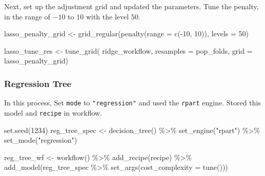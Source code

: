 \documentclass[
]{article}
\newenvironment{Shaded}{\begin{snugshade}}{\end{snugshade}}
\newcommand{\AttributeTok}[1]{\textcolor[rgb]{0.77,0.63,0.00}{#1}}
\newcommand{\DecValTok}[1]{\textcolor[rgb]{0.00,0.00,0.81}{#1}}
\newcommand{\FunctionTok}[1]{\textcolor[rgb]{0.00,0.00,0.00}{#1}}
\newcommand{\NormalTok}[1]{#1}
\newcommand{\OtherTok}[1]{\textcolor[rgb]{0.56,0.35,0.01}{#1}}
\newcommand{\SpecialCharTok}[1]{\textcolor[rgb]{0.00,0.00,0.00}{#1}}
\newcommand{\StringTok}[1]{\textcolor[rgb]{0.31,0.60,0.02}{#1}}
\begin{document}
Next, set up the adjustment grid and updated the parameters. Tune the
penalty, in the range of \(-10\) to \(10\) with the level \(50\).

\begin{Shaded}
\begin{Highlighting}[]
\NormalTok{lasso\_penalty\_grid }\OtherTok{\textless{}{-}} \FunctionTok{grid\_regular}\NormalTok{(}\FunctionTok{penalty}\NormalTok{(}\AttributeTok{range =} \FunctionTok{c}\NormalTok{(}\SpecialCharTok{{-}}\DecValTok{10}\NormalTok{, }\DecValTok{10}\NormalTok{)), }\AttributeTok{levels =} \DecValTok{50}\NormalTok{)}

\NormalTok{lasso\_tune\_res }\OtherTok{\textless{}{-}} \FunctionTok{tune\_grid}\NormalTok{(}
\NormalTok{  ridge\_workflow,}
  \AttributeTok{resamples =}\NormalTok{ pop\_folds, }
  \AttributeTok{grid =}\NormalTok{ lasso\_penalty\_grid)}
\end{Highlighting}
\end{Shaded}

\hypertarget{regression-tree}{%
\subsubsection{Regression Tree}\label{regression-tree}}

In this process, Set \texttt{mode} to \texttt{"regression"} and used the
\texttt{rpart} engine. Stored this model and \texttt{recipe} in
workflow.

\begin{Shaded}
\begin{Highlighting}[]
\FunctionTok{set.seed}\NormalTok{(}\DecValTok{1234}\NormalTok{)}
\NormalTok{reg\_tree\_spec }\OtherTok{\textless{}{-}} \FunctionTok{decision\_tree}\NormalTok{() }\SpecialCharTok{\%\textgreater{}\%}
  \FunctionTok{set\_engine}\NormalTok{(}\StringTok{"rpart"}\NormalTok{) }\SpecialCharTok{\%\textgreater{}\%}
  \FunctionTok{set\_mode}\NormalTok{(}\StringTok{"regression"}\NormalTok{)}

\NormalTok{reg\_tree\_wf }\OtherTok{\textless{}{-}} \FunctionTok{workflow}\NormalTok{() }\SpecialCharTok{\%\textgreater{}\%}
  \FunctionTok{add\_recipe}\NormalTok{(recipe) }\SpecialCharTok{\%\textgreater{}\%}
  \FunctionTok{add\_model}\NormalTok{(reg\_tree\_spec }\SpecialCharTok{\%\textgreater{}\%} \FunctionTok{set\_args}\NormalTok{(}\AttributeTok{cost\_complexity =} \FunctionTok{tune}\NormalTok{()))}
\end{Highlighting}
\end{Shaded}
\end{document}

